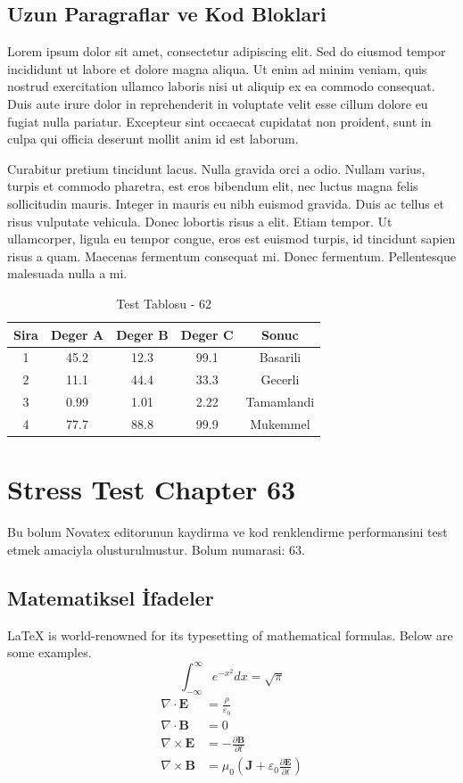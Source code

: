 \documentclass[12pt,a4paper]{article}
\begin{document}
\subsection{Uzun Paragraflar ve Kod Bloklari}
Lorem ipsum dolor sit amet, consectetur adipiscing elit. Sed do eiusmod tempor incididunt ut labore et dolore magna aliqua. Ut enim ad minim veniam, quis nostrud exercitation ullamco laboris nisi ut aliquip ex ea commodo consequat. Duis aute irure dolor in reprehenderit in voluptate velit esse cillum dolore eu fugiat nulla pariatur. Excepteur sint occaecat cupidatat non proident, sunt in culpa qui officia deserunt mollit anim id est laborum.

Curabitur pretium tincidunt lacus. Nulla gravida orci a odio. Nullam varius, turpis et commodo pharetra, est eros bibendum elit, nec luctus magna felis sollicitudin mauris. Integer in mauris eu nibh euismod gravida. Duis ac tellus et risus vulputate vehicula. Donec lobortis risus a elit. Etiam tempor. Ut ullamcorper, ligula eu tempor congue, eros est euismod turpis, id tincidunt sapien risus a quam. Maecenas fermentum consequat mi. Donec fermentum. Pellentesque malesuada nulla a mi.

\begin{table}[h!]
\centering
\begin{tabular}{|c|c|c|c|c|}
\hline
\textbf{Sira} & \textbf{Deger A} & \textbf{Deger B} & \textbf{Deger C} & \textbf{Sonuc} \\
\hline
1 & 45.2 & 12.3 & 99.1 & Basarili \\
2 & 11.1 & 44.4 & 33.3 & Gecerli \\
3 & 0.99 & 1.01 & 2.22 & Tamamlandi \\
4 & 77.7 & 88.8 & 99.9 & Mukemmel \\
\hline
\end{tabular}
\caption{Test Tablosu - 62}
\end{table}

\newpage
\section{Stress Test Chapter 63}
Bu bolum Novatex editorunun kaydirma ve kod renklendirme performansini test etmek amaciyla olusturulmustur. Bolum numarasi: 63.

\subsection{Matematiksel İfadeler}
\LaTeX{} is world-renowned for its typesetting of mathematical formulas. Below are some examples.
\begin{equation}
\int_{-\infty}^{\infty} e^{-x^2} dx = \sqrt{\pi}
\end{equation}
\begin{align}
\nabla \cdot \mathbf{E} &= \frac{\rho}{\varepsilon_0} \\
\nabla \cdot \mathbf{B} &= 0 \\
\nabla \times \mathbf{E} &= -\frac{\partial \mathbf{B}}{\partial t} \\
\nabla \times \mathbf{B} &= \mu_0\left(\mathbf{J} + \varepsilon_0 \frac{\partial \mathbf{E}}{\partial t}\right)
\end{align}
\end{document}
